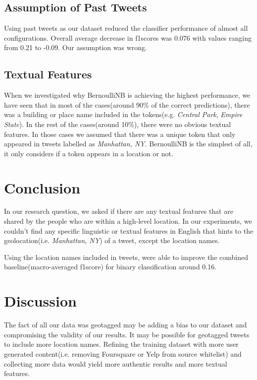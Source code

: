 \documentclass[twoside,11pt]{article}
\begin{document}
\subsection{Assumption of Past Tweets}
Using past tweets as our dataset reduced the classifier performance of almost all configurations. Overall average decrease in f1scores was 0.076 with values ranging from 0.21 to -0.09. Our assumption was wrong.

\subsection{Textual Features}

When we investigated why BernoulliNB is achieving the highest performance, we have seen that in most of the cases(around 90\% of the correct predictions), there was a building or place name included in the tokens(e.g. \textit{Central Park}, \textit{Empire State}). In the rest of the cases(around 10\%), there were no obvious textual features. In those cases we assumed that there was a unique token that only appeared in tweets labelled as \textit{Manhattan, NY}. BernoulliNB is the simplest of all, it only considers if a token appears in a location or not.


\section{Conclusion}

In our research question, we asked if there are any textual features that are shared by the people who are within a high-level location. In our experiments, we couldn't find any specific linguistic or textual features in English that hints to the geolocation(i.e. \textit{Manhattan, NY}) of a tweet, except the location names.

Using the location names included in tweets, were able to improve the combined baseline(macro-averaged f1score) for binary classification around 0.16.

\section{Discussion}

The fact of all our data was geotagged may be adding a bias to our dataset and compromising the validity of our results. It may be possible for geotagged tweets to include more location names. Refining the training dataset with more user generated content(i.e. removing Foursquare or Yelp from source whitelist) and collecting more data would yield more authentic results and more textual features.
\end{document}
